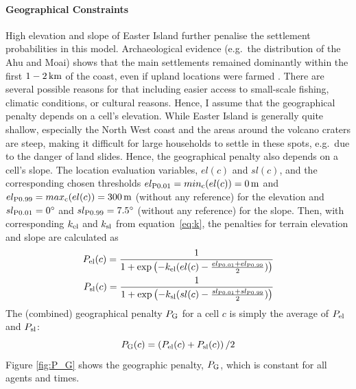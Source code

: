 \paragraph{Geographical Constraints}%
High elevation and slope of Easter Island further penalise the settlement probabilities in this model.
Archaeological evidence (e.g.\ the distribution of the Ahu and Moai) shows that the main settlements remained dominantly within the first $1-2\, \rm{km}$ of the coast, even if upland locations were farmed \citep{Bahn2017}.
There are several possible reasons for that including easier access to small-scale fishing, climatic conditions, or cultural reasons.
Hence, I assume that the geographical penalty depends on a cell's elevation.
While Easter Island is generally quite shallow, especially the North West coast and the areas around the volcano craters are steep, making it difficult for large households to settle in these spots, e.g.\ due to the danger of land slides. 
Hence, the geographical penalty also depends on a cell's slope.
The location evaluation variables, $el(c)$ and $sl(c)$, and the corresponding chosen thresholds $el_{\rm P0.01}=min_{\rm c}(el(c))=0\, {\rm m}$ and $el_{\rm P0.99}=max_{\rm c}(el(c)) = 300\, {\rm m}$ (without any reference) for the elevation and $sl_{\rm P0.01}=0^\circ$ and $sl_{\rm P0.99}=7.5^\circ$ (without any reference) for the slope. 
Then, with corresponding $k_{\rm el}$ and $k_{\rm sl}$ from equation~\ref{eq:k}, the penalties for terrain elevation and slope are calculated as 
\begin{eqnarray}
	P_{\text{el}}(c) = \frac{1}{1+\exp\left( - k_{\rm el} (el(c)-\frac{el_{\rm P0.01}+el_{\rm P0.99}}{2}) \right)}\\
	P_{\text{sl}}(c) = \frac{1}{1+\exp\left( - k_{\rm sl} (sl(c)-\frac{sl_{\rm P0.01}+sl_{\rm P0.99}}{2}) \right)}
\end{eqnarray}
The (combined) geographical penalty $P_{\rm G}$ for a cell $c$ is simply the average of $P_{\rm el}$ and $P_{\rm sl}$:
\begin{equation}
P_{\rm G}(c) = \left(P_\text{el}(c)+P_\text{sl}(c) \right)/2
\end{equation}
Figure \ref{fig:P_G} shows the geographic penalty, $P_{\rm G}$, which is constant for all agents and times.
